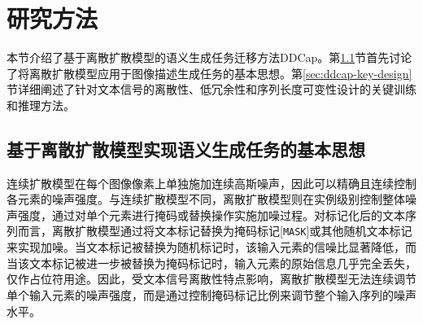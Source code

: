 


\section{研究方法}
\label{sec:ddcap-method-all}
本节介绍了基于离散扩散模型的语义生成任务迁移方法DDCap。第\ref{sec:ddcap-method}节首先讨论了将离散扩散模型应用于图像描述生成任务的基本思想。第\ref{sec:ddcap-key-design}节详细阐述了针对文本信号的离散性、低冗余性和序列长度可变性设计的关键训练和推理方法。


\subsection{基于离散扩散模型实现语义生成任务的基本思想}
\label{sec:ddcap-method}
连续扩散模型在每个图像像素上单独施加连续高斯噪声，因此可以精确且连续控制各元素的噪声强度。与连续扩散模型不同，离散扩散模型则在实例级别控制整体噪声强度，通过对单个元素进行掩码或替换操作实施加噪过程。对标记化后的文本序列而言，离散扩散模型通过将文本标记替换为掩码标记[\texttt{MASK}]或其他随机文本标记来实现加噪。当文本标记被替换为随机标记时，该输入元素的信噪比显著降低，而当该文本标记被进一步被替换为掩码标记时，输入元素的原始信息几乎完全丢失，仅作占位符用途。因此，受文本信号离散性特点影响，离散扩散模型无法连续调节单个输入元素的噪声强度，而是通过控制掩码标记比例来调节整个输入序列的噪声水平。

